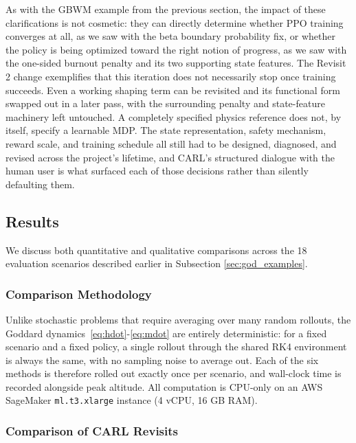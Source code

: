 \documentclass[mnsc,sglanonrev]{informs4}
\begin{document}
As with the GBWM example from the previous section, the impact of these clarifications is not cosmetic: they can directly determine whether PPO training converges at all, as we saw with the beta boundary probability fix, or whether the policy is being optimized toward the right notion of progress, as we saw with the one-sided burnout penalty and its two supporting state features. The Revisit 2 change exemplifies that this iteration does not necessarily stop once training succeeds. Even a working shaping term can be revisited and its functional form swapped out in a later pass, with the surrounding penalty and state-feature machinery left untouched. A completely specified physics reference does not, by itself, specify a learnable MDP. The state representation, safety mechanism, reward scale, and training schedule all still had to be designed, diagnosed, and revised across the project's lifetime, and CARL's structured dialogue with the human user is what surfaced each of those decisions rather than silently defaulting them.



\subsection{Results}
\label{sec:goddard_results}

We discuss both quantitative and qualitative comparisons across the 18 evaluation scenarios described earlier in Subsection \ref{sec:god_examples}.

\subsubsection{Comparison Methodology}
\label{sec:god_crn}

Unlike stochastic problems that require averaging over many random rollouts, the Goddard dynamics~\eqref{eq:hdot}-\eqref{eq:mdot} are entirely deterministic: for a fixed scenario and a fixed policy, a single rollout through the shared RK4 environment is always the same, with no sampling noise to average out. Each of the six methods is therefore rolled out exactly once per scenario, and wall-clock time is recorded alongside peak altitude. All computation is CPU-only on an AWS SageMaker \texttt{ml.t3.xlarge} instance (4 vCPU, 16 GB RAM).

\subsubsection{Comparison of CARL Revisits}
\label{sec:god_carl_revisits}
\end{document}
